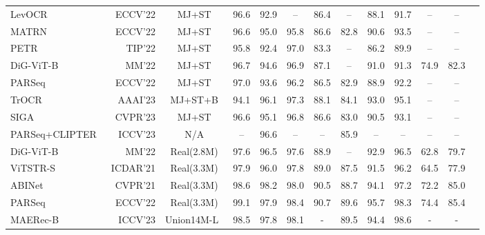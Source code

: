 \documentclass[lettersize,journal]{IEEEtran}
\begin{document}
\begin{table*}[!t]
{\begin{tabular}{l|r|c|cccccccccc}
    LevOCR~\cite{2022_levocr} & ECCV'22 & MJ+ST 
    & 96.6 & 92.9 & -- & 86.4 & -- & 88.1 & 91.7 & -- & -- \\

    MATRN~\cite{2022_matrn} & ECCV'22 & MJ+ST
    & 96.6 & 95.0 & 95.8 & 86.6 & 82.8 & 90.6 & 93.5 & -- & -- \\ 

    PETR~\cite{9865996} & TIP'22 & MJ+ST
    & 95.8 & 92.4 
    & 97.0 & 83.3 & -- & 86.2 & 89.9 & -- & --\\

    DiG-ViT-B~\cite{yang2022reading} & MM'22 & MJ+ST 
    & 96.7 & 94.6 & 96.9 & 87.1 & -- & 91.0 & 91.3 & 74.9 & 82.3 \\

    PARSeq~\cite{2022_parseq} & ECCV'22 & MJ+ST
    & 97.0 & 93.6 & 96.2 & 86.5 & 82.9 & 88.9 & 92.2 & -- & -- \\

    TrOCR~\cite{li2021trocr} & AAAI'23 & MJ+ST+B
    & 94.1 & 96.1 
    & 97.3 & 88.1 & 84.1 & 93.0 & 95.1 & -- & --\\

    SIGA~\cite{guan2023self} & CVPR'23 & MJ+ST
    & 96.6 & 95.1 & 96.8 & 86.6 & 83.0 & 90.5 & 93.1 & -- & -- \\

    PARSeq+CLIPTER~\cite{abs-2301-07464} & ICCV'23 & N/A
    & -- & 96.6 & -- & -- & 85.9 & -- & -- & -- & -- \\





    DiG-ViT-B~\cite{yang2022reading} & MM'22 & Real(2.8M) 
    & 97.6 & 96.5 & 97.6 & 88.9 & -- & 92.9 & 96.5 & 62.8 & 79.7 \\

    ViTSTR-S~\cite{atienza2021vision} & ICDAR'21 & Real(3.3M)
    & 97.9 & 96.0 & 97.8 & 89.0 & 87.5 & 91.5 & 96.2 & 64.5 & 77.9\\

    ABINet~\cite{2021_abinet} & CVPR'21 & Real(3.3M)
    & 98.6 & 98.2 & 98.0 & 90.5 & 88.7 & 94.1 & 97.2 & 72.2 & 85.0 \\
    
    PARSeq~\cite{2022_parseq} & ECCV'22 & Real(3.3M)
    & 99.1 & 97.9 
    & \cellcolor{Gray2}98.4
    & 90.7 & 89.6 & 95.7 & 98.3 & 74.4 & 85.4 \\

    MAERec-B~\cite{jiang2023revisiting} & ICCV'23 & Union14M-L~\cite{jiang2023revisiting}
    & 98.5 & 97.8 
    & 98.1
    & - & 89.5 & 94.4 & 98.6 & - & - \\


\end{tabular}}
\end{table*}
\end{document}
